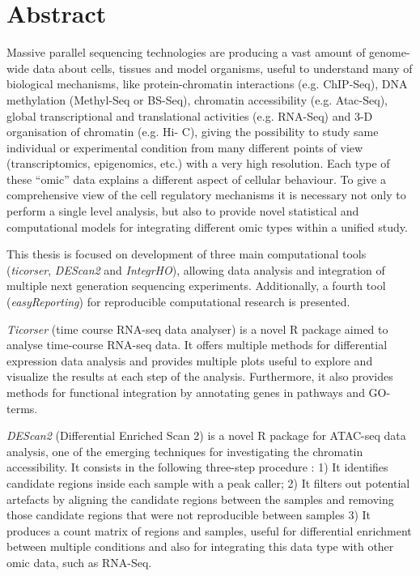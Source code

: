 \section*{Abstract}
{\setlength{\parindent}{0cm}
Massive parallel sequencing technologies are producing a vast amount of genome-wide data about cells, tissues and model organisms, useful to understand many of biological mechanisms, like protein-chromatin interactions (e.g. ChIP-Seq), DNA methylation (Methyl-Seq or BS-Seq), chromatin accessibility (e.g. Atac-Seq), global transcriptional and translational activities (e.g. RNA-Seq) and 3-D organisation of chromatin (e.g. Hi- C), giving the possibility to study same individual or experimental condition from many different points of view (transcriptomics, epigenomics, etc.) with a very high resolution. Each type of these “omic” data explains a different aspect of cellular behaviour. To give a comprehensive view of the cell regulatory mechanisms it is necessary not only to perform a single level analysis, but also to provide novel statistical and computational models for integrating different omic types within a unified study.

This thesis is focused on development of three main computational tools (\textit{ticorser}, \textit{DEScan2} and \textit{IntegrHO}), allowing data analysis and integration of multiple next generation sequencing experiments.
Additionally, a fourth tool (\textit{easyReporting}) for reproducible computational research is presented.

\textit{Ticorser} (time course RNA-seq data analyser) is a novel R package aimed to analyse time-course RNA-seq data. It offers multiple methods for differential expression data analysis and provides multiple plots useful to explore and visualize the results at each step of the analysis. Furthermore, it also provides methods for functional integration by annotating genes in pathways and GO-terms.

\textit{DEScan2} (Differential Enriched Scan 2) is a novel R package for ATAC-seq data analysis, one of the emerging techniques for investigating the chromatin accessibility. It consists in the following three-step procedure : 1) It identifies candidate regions inside each sample with a peak caller; 2) It filters out potential artefacts by aligning the candidate regions between the samples and removing those candidate regions that were not reproducible between samples 3) It produces a count matrix of regions and samples, useful for differential enrichment between multiple conditions and also for integrating this data type with other omic data, such as RNA-Seq.

}
